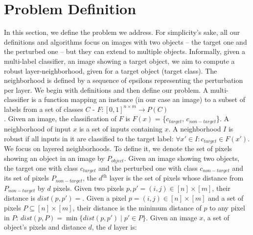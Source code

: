 

\section{Problem Definition}
In this section, we define the problem we address.
For simplicity's sake, all our definitions and algorithms focus on images with two objects -- the target one and the perturbed one -- but they can extend to multiple objects.
Informally, given a multi-label classifier, an image showing a target object, we aim to compute a robust layer-neighborhood, given for a target object (target class).
The neighborhood is defined by a sequence of epsilons representing the perturbation per layer.
We begin with definitions and then define our problem.
A multi-classifier is a function mapping an instance (in our case an image) to a subset of labels from a set of classes $C$ -
$F:[0, 1]^{n \times m} \rightarrow P(C)$\\.
Given an image, the classification of $F$ is $F(x)$ = \{$c_{target}$, $c_{non-target}$\}.
A neighborhood of input $x$ is a set of inputs containing $x$.
A neighborhood $I$ is robust if all inputs in it are classified to the target label: $\forall x' \in I: c_{target} \in F(x').$\\
We focus on layered neighborhoods.
To define it, we denote the set of pixels showing an object in an image by $P_{object}$.
Given an image showing two objects, the target one with class $c_{target}$ and the perturbed one with class $c_{non-target}$ and its set of pixels $P_{non-target}$, the $d^\text{th}$ layer is the set of pixels whose distance from $P_{non-target}$ by $d$ pixels. Given two pixels $p,p' = (i, j)\in [n]\times [m]$, their distance is $dist(p,p')=$. Given a pixel $p = (i, j)\in [n]\times [m]$ and a set of pixels $P\subseteq  [n]\times [m]$, their distance is the minimum distance of $p$ to any pixel in $P$: $dist(p, P) = \min\{dist(p, p') \mid p' \in P\}$. Given an image $x$, a set of object's pixels and distance $d$, the $d$ layer is:
